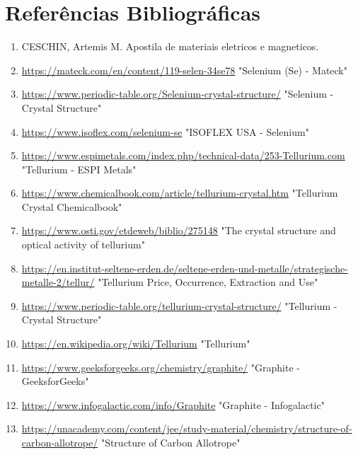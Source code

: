 \documentclass[10pt,twocolumn,letterpaper]{article}
\begin{document}
\section{Referências Bibliográficas}
\small
\begin{enumerate}

\item CESCHIN, Artemis M. Apostila de materiais eletricos e magneticos.
    
    \item \url{https://mateck.com/en/content/119-selen-34se78} "Selenium (Se) - Mateck"
    
    \item \url{https://www.periodic-table.org/Selenium-crystal-structure/} "Selenium - Crystal Structure"
    
    \item \url{https://www.isoflex.com/selenium-se} "ISOFLEX USA - Selenium"
    
    \item \url{https://www.espimetals.com/index.php/technical-data/253-Tellurium.com} "Tellurium - ESPI Metals"
    
    \item \url{https://www.chemicalbook.com/article/tellurium-crystal.htm} "Tellurium Crystal Chemicalbook"
    
    \item \url{https://www.osti.gov/etdeweb/biblio/275148} "The crystal structure and optical activity of tellurium"
    
    \item \url{https://en.institut-seltene-erden.de/seltene-erden-und-metalle/strategische-metalle-2/tellur/} "Tellurium Price, Occurrence, Extraction and Use"
    
    \item \url{https://www.periodic-table.org/tellurium-crystal-structure/} "Tellurium - Crystal Structure"
    
    \item \url{https://en.wikipedia.org/wiki/Tellurium} "Tellurium"
    
    \item \url{https://www.geeksforgeeks.org/chemistry/graphite/} "Graphite - GeeksforGeeks"
    
    \item \url{https://www.infogalactic.com/info/Graphite} "Graphite - Infogalactic"
    
    \item \url{https://unacademy.com/content/jee/study-material/chemistry/structure-of-carbon-allotrope/} "Structure of Carbon Allotrope"
    
\end{enumerate}
\end{document}
